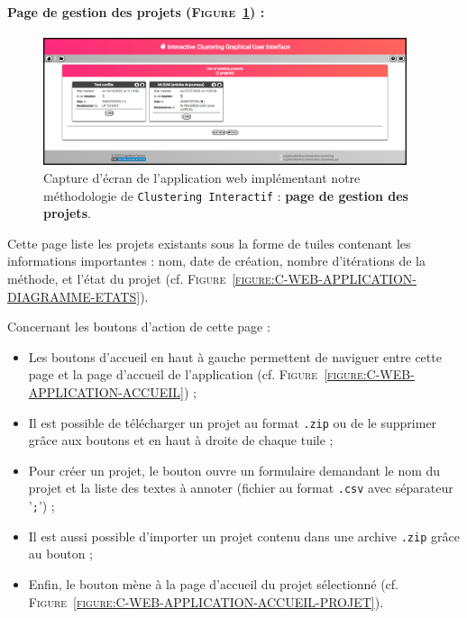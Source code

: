 		
		\paragraph{Page de gestion des projets (\textsc{Figure~\ref{figure:C-WEB-APPLICATION-LISTE-PROJETS}}) :}
			
			\begin{figure}[H]
				\centering
				\includegraphics[width=0.95\textwidth]{figures/interactive-clustering-application-liste-projets}
				\caption{
					Capture d'écran de l'application web implémentant notre méthodologie de \texttt{Clustering Interactif} : \textbf{page de gestion des projets}.
				}
				\label{figure:C-WEB-APPLICATION-LISTE-PROJETS}
			\end{figure}
			
			Cette page liste les projets existants sous la forme de tuiles contenant les informations importantes : nom, date de création, nombre d'itérations de la méthode, et l'état du projet (cf. \textsc{Figure~\ref{figure:C-WEB-APPLICATION-DIAGRAMME-ETATS}}).
			
			Concernant les boutons d'action de cette page :
			\begin{itemize}
				\item Les boutons d'accueil en haut à gauche permettent de naviguer entre cette page et la page d'accueil de l'application (cf. \textsc{Figure~\ref{figure:C-WEB-APPLICATION-ACCUEIL}}) ;
				\item Il est possible de télécharger un projet au format \texttt{.zip} ou de le supprimer grâce aux boutons \textguillemets{\faDownload} et \textguillemets{\faTrash} en haut à droite de chaque tuile ;
				\item Pour créer un projet, le bouton  ouvre un formulaire demandant le nom du projet et la liste des textes à annoter (fichier au format \texttt{.csv} avec séparateur '\texttt{;}') ;
				\item Il est aussi possible d'importer un projet contenu dans une archive \texttt{.zip} grâce au bouton  ;
				\item Enfin, le bouton  mène à la page d'accueil du projet sélectionné (cf. \textsc{Figure~\ref{figure:C-WEB-APPLICATION-ACCUEIL-PROJET}}).
			\end{itemize}
	
